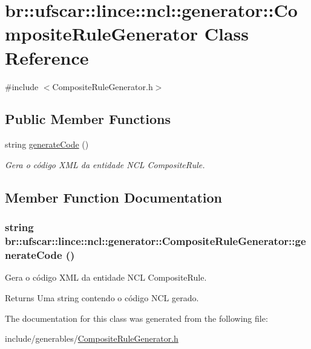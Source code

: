 \hypertarget{classbr_1_1ufscar_1_1lince_1_1ncl_1_1generator_1_1CompositeRuleGenerator}{
\section{br::ufscar::lince::ncl::generator::CompositeRuleGenerator Class Reference}
\label{classbr_1_1ufscar_1_1lince_1_1ncl_1_1generator_1_1CompositeRuleGenerator}
}


{\ttfamily \#include $<$CompositeRuleGenerator.h$>$}

\subsection*{Public Member Functions}
\begin{DoxyCompactItemize}
\item 
string \hyperlink{classbr_1_1ufscar_1_1lince_1_1ncl_1_1generator_1_1CompositeRuleGenerator_a2bb0d38afca2f2c0d722cf5543bac2b8}{generateCode} ()
\begin{DoxyCompactList}\small\item\em Gera o código XML da entidade NCL CompositeRule. \item\end{DoxyCompactList}\end{DoxyCompactItemize}


\subsection{Member Function Documentation}
\hypertarget{classbr_1_1ufscar_1_1lince_1_1ncl_1_1generator_1_1CompositeRuleGenerator_a2bb0d38afca2f2c0d722cf5543bac2b8}{
\subsubsection[{generateCode}]{\setlength{\rightskip}{0pt plus 5cm}string br::ufscar::lince::ncl::generator::CompositeRuleGenerator::generateCode ()}}
\label{classbr_1_1ufscar_1_1lince_1_1ncl_1_1generator_1_1CompositeRuleGenerator_a2bb0d38afca2f2c0d722cf5543bac2b8}


Gera o código XML da entidade NCL CompositeRule. 

\begin{DoxyReturn}{Returns}
Uma string contendo o código NCL gerado. 
\end{DoxyReturn}


The documentation for this class was generated from the following file:\begin{DoxyCompactItemize}
\item 
include/generables/\hyperlink{CompositeRuleGenerator_8h}{CompositeRuleGenerator.h}\end{DoxyCompactItemize}
